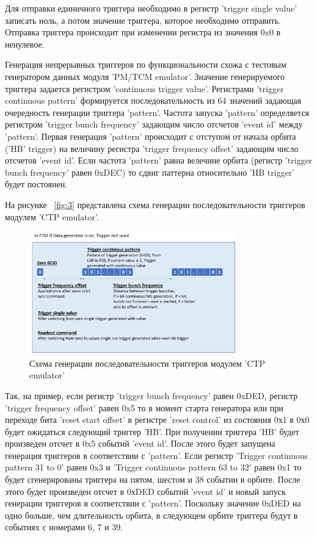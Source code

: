 \documentclass{article}
\begin{document}
Для отправки единичного триггера необходимо в регистр 'trigger single value' записать ноль, а потом значение триггера, которое необходимо отправить. Отправка триггера происходит при изменении регистра из значения 0x0 в ненулевое.



Генерация непрерывных триггеров по функциональности схожа с тестовым генератором данных модуля 'PM/TCM emulator'. Значение генерируемого триггера задается регистром 'continuous trigger value'. Регистрами 'trigger continuous pattern' формируется последовательность из 64 значений задающая очередность генерации триггера 'pattern'. Частота запуска 'pattern' определяется регистром 'trigger bunch frequency' задающим число отсчетов 'event id' между 'pattern'. Первая генерация 'pattern' происходит с отступом от начала орбита ('HB' trigger) на величину регистра 'trigger frequency offset' задающим число отсчетов 'event id'. Если частота 'pattern' равна велечине орбита (регистр 'trigger bunch frequency' равен 0xDEC) то сдвиг паттерна относительно 'HB trigger' будет постоянен. 

На рисунке ~\ref{fig:3} представлена схема генерации последовательности триггеров модулем 'CTP emulator'.

\begin{figure}[H]
	\centering 
	\includegraphics[width=0.8\textwidth]{trigger generator.png}
	\caption{\label{fig:4} Схема генерации последовательности триггеров модулем 'CTP emulator'}
\end{figure}



Так, на пример, если регистр 'trigger bunch frequency' равен 0xDED, регистр 'trigger frequency offset' равен 0x5 то в момент старта генератора или при переходе бита 'reset start offset' в регистре 'reset control' из состояния 0х1 в 0х0 будет ожидаться следующий триггер 'HB'. При получении триггера 'HB' будет произведен отсчет в 0x5 событий 'event id'. После этого будет запущена генерация триггеров в соответствии с 'pattern'. Если регистр 'Trigger continuous pattern 31 to 0' равен 0x3 и 'Trigger continuous pattern 63 to 32' равен 0x1 то будет сгенерированы триггера на пятом, шестом и 38 событии в орбите. После этого будет произведен отсчет в 0хDED событий 'event id' и новый запуск генерации триггеров в соответствии с 'pattern'. Поскольку значение 0xDED на одно больше, чем длительность орбита, в следующем орбите триггера будут в событиях с номерами 6, 7 и 39.
\end{document}
